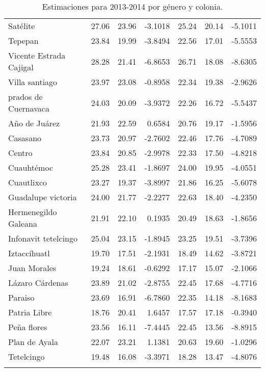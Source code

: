 \documentclass[]{article}
\begin{document}
\begin{longtable}[c]{@{}lrrrrrr@{}}
Satélite & 27.06 & 23.96 & -3.1018 & 25.24 & 20.14 & -5.1011
\\\addlinespace
Tepepan & 23.84 & 19.99 & -3.8494 & 22.56 & 17.01 & -5.5553
\\\addlinespace
Vicente Estrada Cajigal & 28.28 & 21.41 & -6.8653 & 26.71 & 18.08 &
-8.6305
\\\addlinespace
Villa santiago & 23.97 & 23.08 & -0.8958 & 22.34 & 19.38 & -2.9626
\\\addlinespace
prados de Cuernavaca & 24.03 & 20.09 & -3.9372 & 22.26 & 16.72 & -5.5437
\\\addlinespace
Año de Juárez & 21.93 & 22.59 & 0.6584 & 20.76 & 19.17 & -1.5956
\\\addlinespace
Casasano & 23.73 & 20.97 & -2.7602 & 22.46 & 17.76 & -4.7089
\\\addlinespace
Centro & 23.84 & 20.85 & -2.9978 & 22.33 & 17.50 & -4.8218
\\\addlinespace
Cuauhtémoc & 25.28 & 23.41 & -1.8697 & 24.00 & 19.95 & -4.0551
\\\addlinespace
Cuautlixco & 23.27 & 19.37 & -3.8997 & 21.86 & 16.25 & -5.6078
\\\addlinespace
Guadalupe victoria & 24.00 & 21.77 & -2.2277 & 22.63 & 18.40 & -4.2350
\\\addlinespace
Hermenegildo Galeana & 21.91 & 22.10 & 0.1935 & 20.49 & 18.63 & -1.8656
\\\addlinespace
Infonavit tetelcingo & 25.04 & 23.15 & -1.8945 & 23.25 & 19.51 & -3.7396
\\\addlinespace
Iztaccíhuatl & 19.70 & 17.51 & -2.1931 & 18.49 & 14.62 & -3.8721
\\\addlinespace
Juan Morales & 19.24 & 18.61 & -0.6292 & 17.17 & 15.07 & -2.1066
\\\addlinespace
Lázaro Cárdenas & 23.89 & 21.02 & -2.8755 & 22.45 & 17.68 & -4.7716
\\\addlinespace
Paraiso & 23.69 & 16.91 & -6.7860 & 22.35 & 14.18 & -8.1683
\\\addlinespace
Patria Libre & 18.76 & 20.41 & 1.6457 & 17.57 & 17.18 & -0.3940
\\\addlinespace
Peña flores & 23.56 & 16.11 & -7.4445 & 22.45 & 13.56 & -8.8915
\\\addlinespace
Plan de Ayala & 22.07 & 23.21 & 1.1381 & 20.63 & 19.60 & -1.0296
\\\addlinespace
Tetelcingo & 19.48 & 16.08 & -3.3971 & 18.28 & 13.47 & -4.8076
\\\addlinespace
\bottomrule
\addlinespace
\caption{Estimaciones para 2013-2014 por género y colonia.}
\end{longtable}
\end{document}

